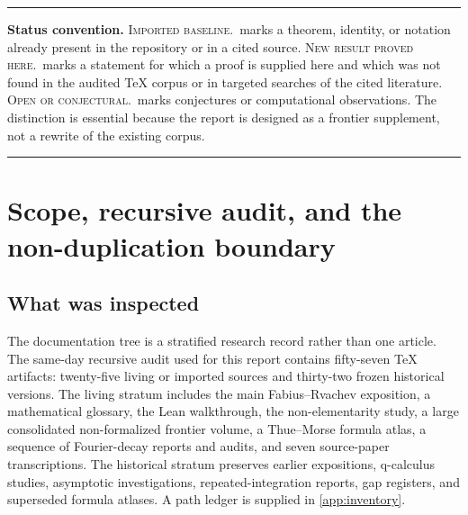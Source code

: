 \documentclass[11pt,oneside]{article}
\theoremstyle{definition}
\theoremstyle{remark}
\newcommand{\Q}{\mathbb Q}
\newcommand{\newresult}{\textcolor{newgreen}{\textsc{New result proved here.}}}
\newcommand{\imported}{\textcolor{importblue}{\textsc{Imported baseline.}}}
\newcommand{\openstatus}{\textcolor{conjectureorange}{\textsc{Open or conjectural.}}}
\newenvironment{boxedremark}{\par\smallskip\noindent\begin{center}\begin{minipage}{0.94\textwidth}\hrule\vspace{0.6em}\small}{\vspace{0.6em}\hrule\end{minipage}\end{center}\smallskip}
\begin{document}
\begin{abstract}
The folded coefficients form a Galois orbit in the maximal real
$2^{n+1}$-st cyclotomic field.  Their orbit polynomial lies in $\Q[X]$; all power
traces are explicit rational convolutions of dyadic Fabius values with a
Ramanujan-sum congruence filter.  These rational traces converge to nonlinear
spectral moments $\sum_k a_k^m$.  An additional exact factorization isolates a
finite Thue--Morse polynomial value as the sign carrier of every alias class.
Finally, the all-order Prouhet identities turn the endpoint function into an
exact ``beyond all algebraic orders'' spectral remainder.  Inserting the
repo's corrected Lambert--$W$ asymptotic produces a direct, explicit bridge
between the signed half-integer sinc amplitudes and the lower-Lambert saddle.
All new claims below are proved for human verification; none is represented as
already formalized in Lean.  Novelty is asserted only relative to the reviewed
repository corpus and targeted source searches, not as a universal priority
claim.
\end{abstract}

\begin{boxedremark}
\textbf{Status convention.}
\imported\ marks a theorem, identity, or notation already present in the
repository or in a cited source.  \newresult\ marks a statement for which a
proof is supplied here and which was not found in the audited TeX corpus or in
targeted searches of the cited literature.  \openstatus\ marks conjectures or
computational observations.  The distinction is essential because the report
is designed as a frontier supplement, not a rewrite of the existing corpus.
\end{boxedremark}

\tableofcontents
\newpage

\section{Scope, recursive audit, and the non-duplication boundary}\label{sec:scope}

\subsection{What was inspected}

The documentation tree is a stratified research record rather than one article.
The same-day recursive audit used for this report contains fifty-seven TeX
artifacts: twenty-five living or imported sources and thirty-two frozen historical
versions.  The living stratum includes the main Fabius--Rvachev exposition, a
mathematical glossary, the Lean walkthrough, the non-elementarity study, a
large consolidated non-formalized frontier volume, a Thue--Morse formula atlas,
a sequence of Fourier-decay reports and audits, and seven source-paper
transcriptions.  The historical stratum preserves earlier expositions, q-calculus
studies, asymptotic investigations, repeated-integration reports, gap registers,
and superseded formula atlases.  A path ledger is supplied in
\cref{app:inventory}.
\end{document}
